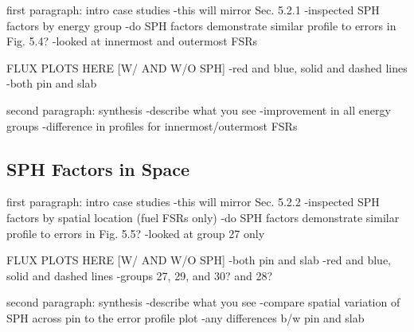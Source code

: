 first paragraph: intro case studies
-this will mirror Sec. 5.2.1
-inspected SPH factors by energy group
-do SPH factors demonstrate similar profile to errors in Fig. 5.4?
-looked at innermost and outermost FSRs

FLUX PLOTS HERE [W/ AND W/O SPH]
-red and blue, solid and dashed lines
-both pin and slab

second paragraph: synthesis
-describe what you see
-improvement in all energy groups
-difference in profiles for innermost/outermost FSRs

\subsection{SPH Factors in Space}
\label{subsubsec:chap6-sph-space}

first paragraph: intro case studies
-this will mirror Sec. 5.2.2
-inspected SPH factors by spatial location (fuel FSRs only)
-do SPH factors demonstrate similar profile to errors in Fig. 5.5?
-looked at group 27 only

FLUX PLOTS HERE [W/ AND W/O SPH]
-both pin and slab
-red and blue, solid and dashed lines
-groups 27, 29, and 30? and 28?

second paragraph: synthesis
-describe what you see
-compare spatial variation of SPH across pin to the error profile plot
-any differences b/w pin and slab





